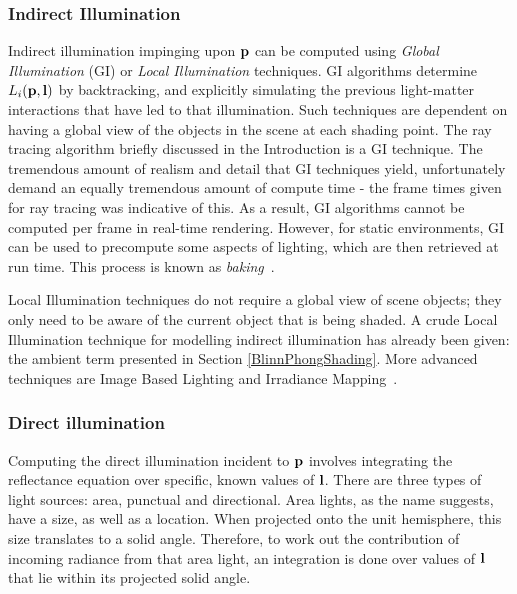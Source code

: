 \subsubsection{Indirect Illumination}

Indirect illumination impinging upon \begin{math}\mathbf{p}\end{math} can be computed using \textit{Global Illumination} (GI) or \textit{Local Illumination} techniques. GI algorithms determine \begin{math}L_i(\mathbf{p}, \mathbf{l})\end{math} by backtracking, and explicitly simulating the previous light-matter interactions that have led to that illumination. Such techniques are dependent on having a global view of the objects in the scene at each shading point. The ray tracing algorithm briefly discussed in the Introduction is a GI technique. The tremendous amount of realism and detail that GI techniques yield, unfortunately demand an equally tremendous amount of compute time - the frame times given for ray tracing was indicative of this. As a result, GI algorithms cannot be computed per frame in real-time rendering. However, for static environments, GI can be used to precompute some aspects of lighting, which are then retrieved at run time. This process is known as \textit{baking}~\cite{UberBake}.

Local Illumination techniques do not require a global view of scene objects; they only need to be aware of the current object that is being shaded. A crude Local Illumination technique for modelling indirect illumination has already been given: the ambient term presented in Section \ref{BlinnPhongShading}. More advanced techniques are Image Based Lighting and Irradiance Mapping~\cite{HoffmanPBSBackground, IrradianceMaps}.

\subsubsection{Direct illumination}

Computing the direct illumination incident to \begin{math}\mathbf{p}\end{math} involves integrating the reflectance equation over specific, known values of \begin{math}\mathbf{l}\end{math}. There are three types of light sources: area, punctual and directional. Area lights, as the name suggests, have a size, as well as a location. When projected onto the unit hemisphere, this size translates to a solid angle. Therefore, to work out the contribution of incoming radiance from that area light, an integration is done over values of \begin{math}\mathbf{l}\end{math} that lie within its projected solid angle.


